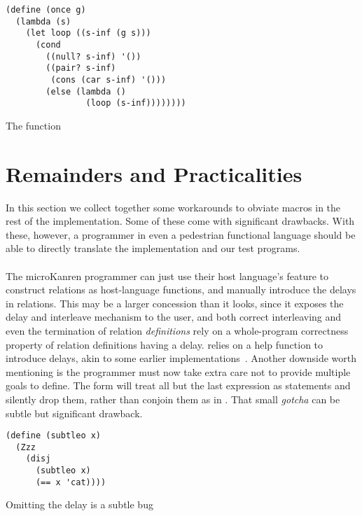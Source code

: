 \documentclass[sigplan,draft,balance,pbalance,natbib=false]{acmart}
\begin{document}
\begin{listing}
  \begin{verbatim}
(define (once g)
  (lambda (s)
    (let loop ((s-inf (g s)))
      (cond
        ((null? s-inf) '())
        ((pair? s-inf)
         (cons (car s-inf) '()))
        (else (lambda ()
                (loop (s-inf))))))))
  \end{verbatim}
  \caption{The  function} %
  \label{mnt:condu-reimplementation}
\end{listing}


\section{Remainders and Practicalities}\label{sec:functional}

In this section we collect together some workarounds to obviate macros
in the rest of the implementation. Some of these come with significant
drawbacks. With these, however, a programmer in even a pedestrian
functional language should be able to directly translate the
implementation and our test programs.

\paragraph{}

The microKanren programmer can just use their host
language's  feature to construct relations as
host-language functions, and manually introduce the delays in
relations. This may be a larger concession than it looks, since it
exposes the delay and interleave mechanism to the user, and both
correct interleaving and even the termination of relation
\emph{definitions} rely on a whole-program correctness property of
relation definitions having a delay.  relies on a
help function  to introduce delays, akin to some
earlier implementations~\cite{hemann2013muKanren}. Another downside
worth mentioning is the programmer must now take extra care not to
provide multiple goals to define. The  form will
treat all but the last expression as statements and silently drop
them, rather than conjoin them as in . That small
\emph{gotcha} can be subtle but significant drawback.

\begin{listing}
  \begin{verbatim}
(define (subtleo x)
  (Zzz
    (disj
      (subtleo x)
      (== x 'cat))))
  \end{verbatim}
  \caption{Omitting the delay is a subtle bug}
  \label{mnt:subtleo}
\end{listing}
\end{document}
